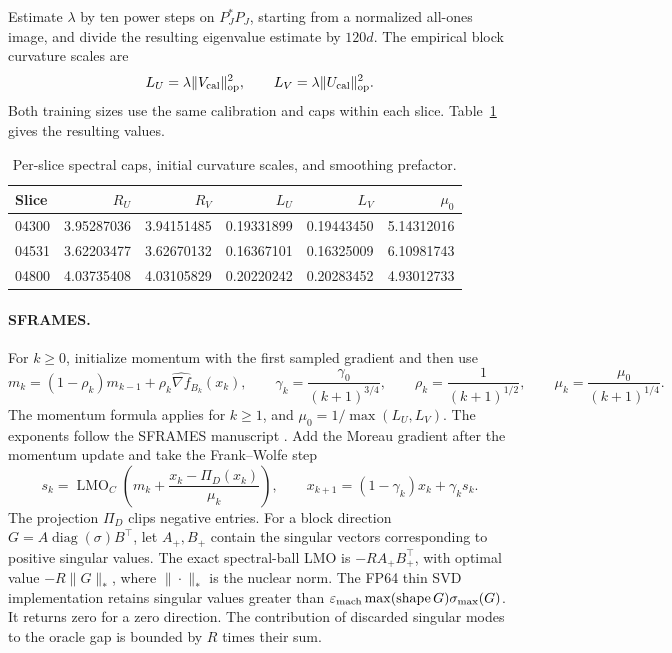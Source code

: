 \documentclass[11pt]{article}
\begin{document}
Estimate \(\lambda\) by ten power steps on \(P_J^\ast P_J\), starting from a normalized all-ones image, and divide the resulting eigenvalue estimate by \(120d\). The empirical block curvature scales are
\[
  L_U=\lambda\|V_{\rm cal}\|_{\rm op}^2,\qquad
  L_V=\lambda\|U_{\rm cal}\|_{\rm op}^2 .
\]
Both training sizes use the same calibration and caps within each slice. Table~\ref{tab:ct-curvature} gives the resulting values.

\begin{table}[htbp]
  \centering
  \caption{Per-slice spectral caps, initial curvature scales, and smoothing prefactor.}
  \label{tab:ct-curvature}
  \begin{tabular}{@{}lrrrrr@{}}
    \toprule
    Slice & \(R_U\) & \(R_V\) & \(L_U\) & \(L_V\) & \(\mu_0\) \\
    \midrule
04300 & 3.95287036 & 3.94151485 & 0.19331899 & 0.19443450 & 5.14312016 \\
04531 & 3.62203477 & 3.62670132 & 0.16367101 & 0.16325009 & 6.10981743 \\
04800 & 4.03735408 & 4.03105829 & 0.20220242 & 0.20283452 & 4.93012733 \\
    \bottomrule
  \end{tabular}
\end{table}

\paragraph{SFRAMES.}
For \(k\ge0\), initialize momentum with the first sampled gradient and then use
\[
  m_k=(1-\rho_k)m_{k-1}+\rho_k\widehat{\nabla f}_{B_k}(x_k),
  \qquad
  \gamma_k=\frac{\gamma_0}{(k+1)^{3/4}},\qquad
  \rho_k=\frac{1}{(k+1)^{1/2}},\qquad
  \mu_k=\frac{\mu_0}{(k+1)^{1/4}} .
\]
The momentum formula applies for \(k\ge1\), and \(\mu_0=1/\max(L_U,L_V)\). The exponents follow the SFRAMES manuscript \cite{sframes}. Add the Moreau gradient after the momentum update and take the Frank--Wolfe step
\[
  s_k=\operatorname{LMO}_C\left(m_k+
             \frac{x_k-\Pi_D(x_k)}{\mu_k}\right),
  \qquad
  x_{k+1}=(1-\gamma_k)x_k+\gamma_k s_k .
\]
The projection \(\Pi_D\) clips negative entries. For a block direction
\(G=A\operatorname{diag}(\sigma)B^\top\), let \(A_+,B_+\) contain the
singular vectors corresponding to positive singular values. The exact
spectral-ball LMO is \(-R A_+B_+^\top\), with optimal value
\(-R\|G\|_*\), where \(\|\cdot\|_*\) is the nuclear norm. The FP64 thin SVD
implementation retains singular values greater than
\(\varepsilon_{\rm mach}\max(\operatorname{shape}G)\sigma_{\max}(G)\).
It returns zero for a zero direction. The contribution of discarded
singular modes to the oracle gap is bounded by \(R\) times their sum.
\end{document}
